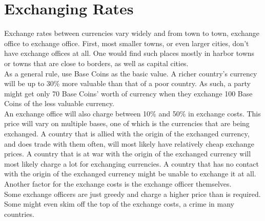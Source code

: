 \section{Exchanging Rates}\label{sec:exchangeRates}
Exchange rates between currencies vary widely and from town to town, exchange office to exchange office.
First, most smaller towns, or even larger cities, don't have exchange offices at all.
One would find such places mostly in harbor towns or towns that are close to borders, as well as capital cities.\\
As a general rule, use Base Coins as the basic value.
A richer country's currency will be up to 30\% more valuable than that of a poor country.
As such, a party might get only 70 Base Coins' worth of currency when they exchange 100 Base Coins of the less valuable currency.\\
An exchange office will also charge between 10\% and 50\% in exchange costs.
This price will vary on multiple bases, one of which is the currencies that are being exchanged.
A country that is allied with the origin of the exchanged currency, and does trade with them often, will most likely have relatively cheap exchange prices.
A country that is at war with the origin of the exchanged currency will most likely charge a lot for exchanging currencies.
A country that has no contact with the origin of the exchanged currency might be unable to exchange it at all.
Another factor for the exchange costs is the exchange officer themselves.\\
Some exchange officers are just greedy and charge a higher price than is required.
Some might even skim off the top of the exchange costs, a crime in many countries.

